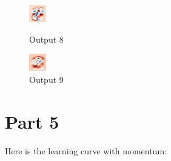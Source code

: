 \documentclass[10pt,letterpaper]{article}
\begin{document}
	\begin{figure}[H]
		\begin{minipage}{0.48\linewidth}
		    \centering
			\includegraphics[width=0.7\linewidth]{imgs/weights_visual_8.png}
			\caption{Output 8}
			\label{fig:part5-8}
		\end{minipage}
		\begin{minipage}{0.48\linewidth}
		    \centering
			\includegraphics[width=0.7\linewidth]{imgs/weights_visual_9.png}
			\caption{Output 9}
			\label{fig:part5-9}
		\end{minipage}
	\end{figure}


	\section{Part 5}
	Here is the learning curve with momentum:
\end{document}
